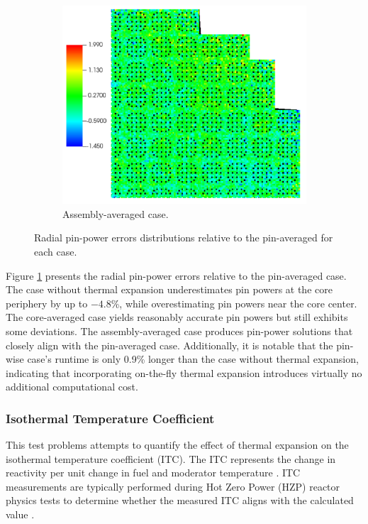 \begin{figure}
\begin{subfigure}[b]{0.5\textwidth}
        \centering
        \includegraphics[width=\textwidth]{figs/pin_error_assembly.pdf}
        \caption{Assembly-averaged case.}
    \end{subfigure}
    \caption[Radial pin-power errors distributions relative to the pin-averaged case]{Radial pin-power errors distributions relative to the pin-averaged for each case.}
    \label{fig_421}
\end{figure}

Figure \ref{fig_421} presents the radial pin-power errors relative to the pin-averaged case. The case without thermal expansion underestimates pin powers at the core periphery by up to $-4.8$\%, while overestimating pin powers near the core center. The core-averaged case yields reasonably accurate pin powers but still exhibits some deviations. The assembly-averaged case produces pin-power solutions that closely align with the pin-averaged case. Additionally, it is notable that the pin-wise case's runtime is only 0.9\% longer than the case without thermal expansion, indicating that incorporating on-the-fly thermal expansion introduces virtually no additional computational cost.

\subsubsection{Isothermal Temperature Coefficient}

This test problems attempts to quantify the effect of thermal expansion on the isothermal temperature coefficient (ITC). The ITC represents the change in reactivity per unit change in fuel and moderator temperature \cite{ansi}. ITC measurements are typically performed during Hot Zero Power (HZP) reactor physics tests to determine whether the measured ITC aligns with the calculated value \cite{hong}.

